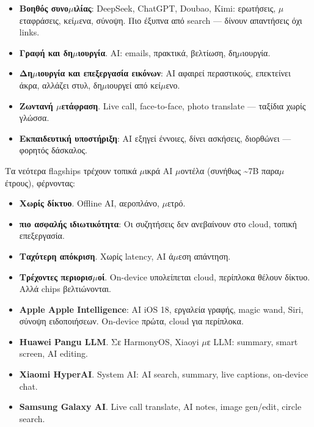 \begin{itemize}
  \item \textbf{Βοηθός συνο$\mu$ιλίας}: DeepSeek, ChatGPT, Doubao, Kimi: ερωτήσεις, $\mu$εταφράσεις, κεί$\mu$ενα, σύνοψη. Πιο έξυπνα από search — δίνουν απαντήσεις όχι links.
  \item \textbf{Γραφή και δη$\mu$ιουργία}. AI: emails, πρακτικά, βελτίωση, δη$\mu$ιουργία.
  \item \textbf{Δη$\mu$ιουργία και επεξεργασία εικόνων}: AI αφαιρεί περαστικούς, επεκτείνει άκρα, αλλάζει στυλ, δη$\mu$ιουργεί από κεί$\mu$ενο.
  \item \textbf{Ζωντανή $\mu$ετάφραση}. Live call, face-to-face, photo translate — ταξίδια χωρίς γλώσσα.
  \item \textbf{Εκπαιδευτική υποστήριξη}: AI εξηγεί έννοιες, δίνει ασκήσεις, διορθώνει — φορητός δάσκαλος.
\end{itemize}


Τα νεότερα flagships τρέχουν τοπικά $\mu$ικρά AI $\mu$οντέλα (συνήθως \textasciitilde{}7B παρα$\mu$έτρους), φέρνοντας:

\begin{itemize}
  \item \textbf{Χωρίς δίκτυο}. Offline AI, αεροπλάνο, $\mu$ετρό.
  \item \textbf{πιο ασφαλής ιδιωτικότητα}: Οι συζητήσεις δεν ανεβαίνουν στο cloud, τοπική επεξεργασία.
  \item \textbf{Ταχύτερη απόκριση}. Χωρίς latency, AI ά$\mu$εση απάντηση.
  \item \textbf{Τρέχοντες περιορισ$\mu$οί}. On-device υπολείπεται cloud, περίπλοκα θέλουν δίκτυο. Αλλά chips βελτιώνονται.
\end{itemize}


\begin{itemize}
  \item \textbf{Apple Apple Intelligence}: AI iOS 18, εργαλεία γραφής, magic wand, Siri, σύνοψη ειδοποιήσεων. On-device πρώτα, cloud για περίπλοκα.
  \item \textbf{Huawei Pangu LLM}. Σε HarmonyOS, Xiaoyi $\mu$ε LLM: summary, smart screen, AI editing.
  \item \textbf{Xiaomi HyperAI}. System AI: AI search, summary, live captions, on-device chat.
  \item \textbf{Samsung Galaxy AI}. Live call translate, AI notes, image gen/edit, circle search.
\end{itemize}

